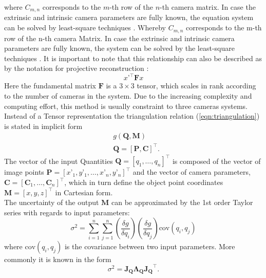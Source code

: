 \documentclass[5p,times,procedia]{elsarticle}
\begin{document}
%
where $C_{m,n}$ corresponds to the $m$-th row of the $n$-th camera matrix.
In case the extrinsic and intrinsic camera parameters are fully known, the equation system can be solved by least-square techniques \cite{Ahn2004}.
%
Whereby $C_{m,n}$ corresponds to the m-th row of the n-th camera Matrix.
In case the extrinsic and intrinsic camera parameters are fully known, the system can be solved by the least-square techniques \cite{Ahn2004}.
%
It is important to note that this relationship can also be described as by the notation for projective reconstruction \cite{Hartley2018}:
\begin{equation}
	\label{eqn:ProjectiveReconstruction}
	x’^{\top}\mathbf{F}x
\end{equation}
%
Here the fundamental matrix $\mathbf{F}$ is a $3\times 3$ tensor, which scales in rank according to the number of cameras in the system. Due to the increasing complexity and computing effort, this method is usually constraint to three cameras systems.\\
Instead of a Tensor representation the triangulation relation (\ref{eqn:triangulation}) is stated in implicit form
%
\begin{equation}
	\label{eqn:ImplicitFrom}
	\begin{aligned}
		& g(\mathbf{Q},\mathbf{M}) \\
		& \mathbf{Q} = [\mathbf{P},\mathbf{C}]^{\top}.
	\end{aligned}
\end{equation}
%
The vector of the input Quantities $\mathbf{Q} = \left[q_1,\dots, q_{n}\right]^{\top}$ is composed of the vector of image points $\mathbf{P} = [x’_1,y’_1, \dots ,x’_n,y’_n]^{\top}$ and the vector of camera parameters, $\mathbf{C} = \left[ \mathbf{C}_1 , \dots , \mathbf{C}_n \right]^{\top}$, which in turn define the object point coordinates $\mathbf{M} =  [x,y,z]^{\top}$ in Cartesian form. \\
The uncertainty of the output $\mathbf{M}$ can be approximated by the 1st order Taylor series with regards to input parameters:
%
\begin{equation}
	\sigma^2 = \sum_{i=1}^{n}\sum_{j=1}^{n} \left(\frac{\delta g}{\delta q_i}\right) \left(\frac{\delta g}{\delta q_j}\right) \mathrm{cov}(q_i, q_j) 
\end{equation}
where $\mathrm{cov}(q_i, q_j) $ is the covariance between two input parameters. More commonly it is known in the form~\cite{Cox2006}  
\begin{equation}
	\sigma^2 = \mathbf{J_{Q}}\mathbf{\Lambda_{Q}}\mathbf{J_{Q}}^{\top}.
\end{equation}
\end{document}
